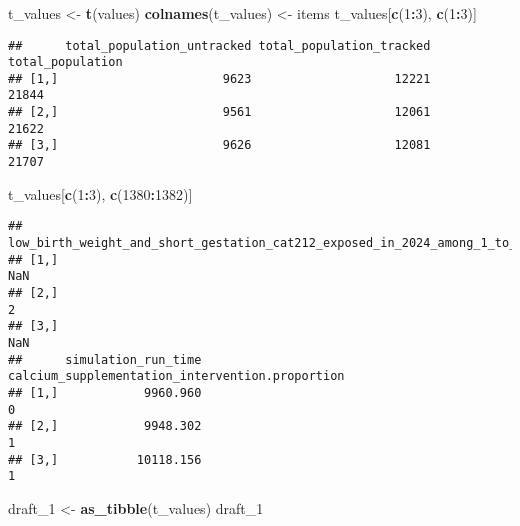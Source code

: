 \documentclass[]{article}
\newenvironment{Shaded}{\begin{snugshade}}{\end{snugshade}}
\newcommand{\DecValTok}[1]{\textcolor[rgb]{0.00,0.00,0.81}{#1}}
\newcommand{\KeywordTok}[1]{\textcolor[rgb]{0.13,0.29,0.53}{\textbf{#1}}}
\newcommand{\NormalTok}[1]{#1}
\newcommand{\OperatorTok}[1]{\textcolor[rgb]{0.81,0.36,0.00}{\textbf{#1}}}
\newcommand{\StringTok}[1]{\textcolor[rgb]{0.31,0.60,0.02}{#1}}
\begin{document}
\hypertarget{section}{%
\subsubsection{}\label{section}}

\begin{Shaded}
\begin{Highlighting}[]
\NormalTok{t_values <-}\StringTok{ }\KeywordTok{t}\NormalTok{(values)}
\KeywordTok{colnames}\NormalTok{(t_values) <-}\StringTok{ }\NormalTok{items}
\NormalTok{t_values[}\KeywordTok{c}\NormalTok{(}\DecValTok{1}\OperatorTok{:}\DecValTok{3}\NormalTok{), }\KeywordTok{c}\NormalTok{(}\DecValTok{1}\OperatorTok{:}\DecValTok{3}\NormalTok{)]}
\end{Highlighting}
\end{Shaded}

\begin{verbatim}
##      total_population_untracked total_population_tracked total_population
## [1,]                       9623                    12221            21844
## [2,]                       9561                    12061            21622
## [3,]                       9626                    12081            21707
\end{verbatim}

\begin{Shaded}
\begin{Highlighting}[]
\NormalTok{t_values[}\KeywordTok{c}\NormalTok{(}\DecValTok{1}\OperatorTok{:}\DecValTok{3}\NormalTok{), }\KeywordTok{c}\NormalTok{(}\DecValTok{1380}\OperatorTok{:}\DecValTok{1382}\NormalTok{)]}
\end{Highlighting}
\end{Shaded}

\begin{verbatim}
##      low_birth_weight_and_short_gestation_cat212_exposed_in_2024_among_1_to_4
## [1,]                                                                      NaN
## [2,]                                                                        2
## [3,]                                                                      NaN
##      simulation_run_time calcium_supplementation_intervention.proportion
## [1,]            9960.960                                               0
## [2,]            9948.302                                               1
## [3,]           10118.156                                               1
\end{verbatim}

\begin{Shaded}
\begin{Highlighting}[]
\NormalTok{draft_}\DecValTok{1}\NormalTok{ <-}\StringTok{ }\KeywordTok{as_tibble}\NormalTok{(t_values)}
\NormalTok{draft_}\DecValTok{1}
\end{Highlighting}
\end{Shaded}
\end{document}
